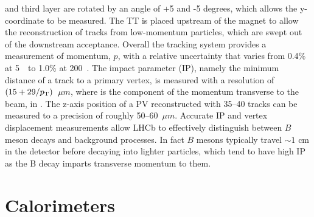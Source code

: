 and third layer are rotated by an angle of +5 and -5 degrees, which allows the y-coordinate to be measured. 
The TT is placed upstream of the magnet to allow the reconstruction of tracks from low-momentum particles,
which are swept out of the downstream acceptance. Overall the tracking system provides a measurement of momentum, 
$p$,  with a relative uncertainty that varies from 0.4\% at 5~\gevc~to 1.0\% at 200~\gevc. 
The impact parameter (IP), namely the minimum distance of a track to a primary vertex, is measured 
with a resolution of $(15 + 29/\mbox{$p_{\rm T}$})$~$\mu m$, where \pt is the component of the momentum transverse to the 
beam, in \gevc. The z-axis position of a PV reconstructed with 35--40 tracks can be measured to a precision of roughly 
50--60~$\mu m$. Accurate IP and vertex displacement measurements allow LHCb to effectively distinguish 
between $B$ meson decays and background processes. In fact $B$ mesons typically travel $\sim 1$ cm in
the detector before decaying into lighter particles, which tend to have high IP as the B decay imparts
transverse momentum to them.


\section{Calorimeters}
\label{sec:calorimeters}


